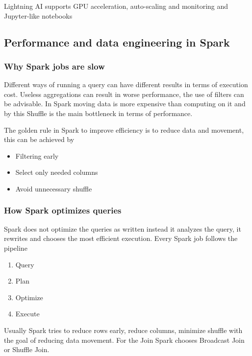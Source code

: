 Lightning AI supports GPU acceleration, auto-scaling and monitoring and Jupyter-like notebooks

\subsection{Performance and data engineering in Spark}

\subsubsection{Why Spark jobs are slow}

Different ways of running a query can have different results in terms of execution cost. Useless aggregations can result in worse performance, the use of filters can be advisable. In Spark moving data is more expensive than computing on it and by this Shuffle is the main bottleneck in terms of performance.

\vspace{10pt}

The golden rule in Spark to improve efficiency is to reduce data and movement, this can be achieved by

\begin{itemize}
    \item Filtering early
    \item Select only needed columns
    \item Avoid unnecessary shuffle
\end{itemize}


\subsubsection{How Spark optimizes queries}

Spark does not optimize the queries as written instead it analyzes the query, it rewrites and chooses the most efficient execution. Every Spark job follows the pipeline

\begin{enumerate}
    \item Query
    \item Plan
    \item Optimize
    \item Execute
\end{enumerate}

Usually Spark tries to reduce rows early, reduce columns, minimize shuffle with the goal of reducing data movement. For the Join Spark chooses Broadcast Join or Shuffle Join.



